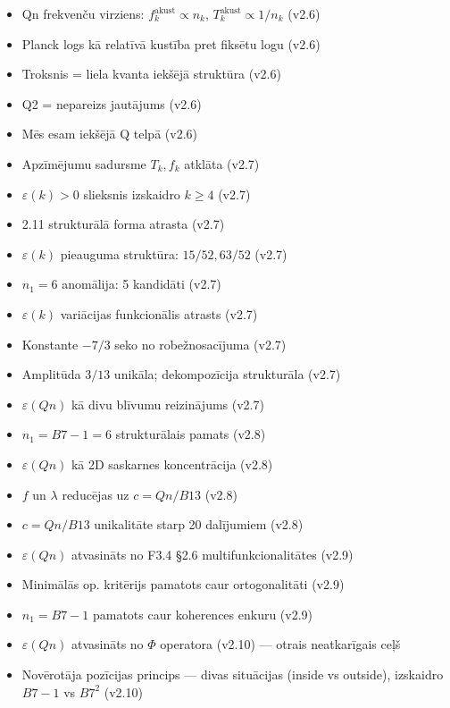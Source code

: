 \documentclass[12pt,a4paper]{article}
\begin{document}
\begin{itemize}
    \item Qn frekvenču virziens: $f_k^{\text{akust}} \propto n_k$, $T_k^{\text{akust}} \propto 1/n_k$ (v2.6)
    \item Planck logs kā relatīvā kustība pret fiksētu logu (v2.6)
    \item Troksnis = liela kvanta iekšējā struktūra (v2.6)
    \item Q2 = nepareizs jautājums (v2.6)
    \item Mēs esam iekšējā Q telpā (v2.6)
    \item Apzīmējumu sadursme $T_k, f_k$ atklāta (v2.7)
    \item $\varepsilon(k) > 0$ slieksnis izskaidro $k \geq 4$ (v2.7)
    \item 2.11 strukturālā forma atrasta (v2.7)
    \item $\varepsilon(k)$ pieauguma struktūra: $15/52, 63/52$ (v2.7)
    \item $n_1 = 6$ anomālija: 5 kandidāti (v2.7)
    \item $\varepsilon(k)$ variācijas funkcionālis atrasts (v2.7)
    \item Konstante $-7/3$ seko no robežnosacījuma (v2.7)
    \item Amplitūda $3/13$ unikāla; dekompozīcija strukturāla (v2.7)
    \item $\varepsilon(Qn)$ kā divu blīvumu reizinājums (v2.7)
    \item $n_1 = B7-1 = 6$ strukturālais pamats (v2.8)
    \item $\varepsilon(Qn)$ kā 2D saskarnes koncentrācija (v2.8)
    \item $f$ un $\lambda$ reducējas uz $c = Qn/B13$ (v2.8)
    \item $c = Qn/B13$ unikalitāte starp 20 dalījumiem (v2.8)
    \item $\varepsilon(Qn)$ atvasināts no F3.4 §2.6 multifunkcionalitātes (v2.9)
    \item Minimālās op. kritērijs pamatots caur ortogonalitāti (v2.9)
    \item $n_1 = B7-1$ pamatots caur koherences enkuru (v2.9)
    \item $\varepsilon(Qn)$ atvasināts no $\Phi$ operatora (v2.10) — otrais neatkarīgais ceļš
    \item Novērotāja pozīcijas princips — divas situācijas (inside vs outside), izskaidro $B7-1$ vs $B7^2$ (v2.10)
\end{itemize}
\end{document}
